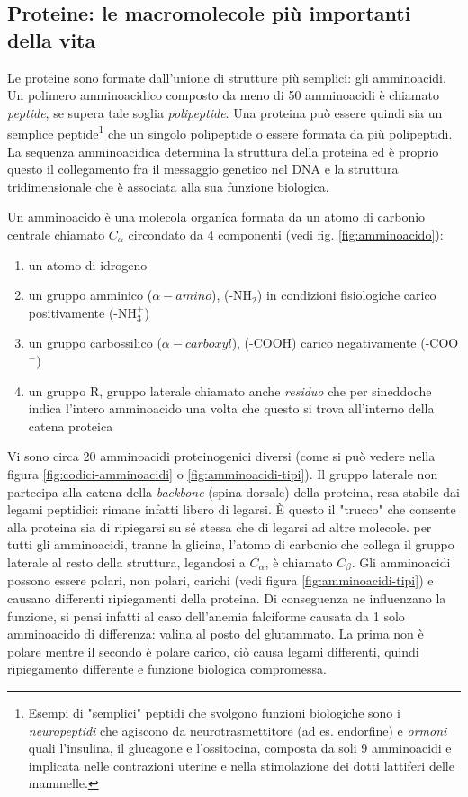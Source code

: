 \subsection{Proteine: le macromolecole più importanti della vita}

Le proteine sono formate dall'unione di strutture più semplici: gli amminoacidi. Un polimero amminoacidico composto da meno di 50 amminoacidi è chiamato \textit{peptide}, se supera tale soglia \textit{polipeptide}. Una proteina può essere quindi sia un semplice peptide\footnote{Esempi di "semplici" peptidi che svolgono funzioni biologiche sono i \textit{neuropeptidi} che agiscono da neurotrasmettitore (ad es. endorfine) e \textit{ormoni} quali l'insulina, il glucagone e l'ossitocina, composta da soli 9 amminoacidi e implicata nelle contrazioni uterine e nella stimolazione dei dotti lattiferi delle mammelle.} che un singolo polipeptide o essere formata da più polipeptidi. La sequenza amminoacidica determina la struttura della proteina ed è proprio questo il collegamento fra il messaggio genetico nel DNA e la struttura tridimensionale che è associata alla sua funzione biologica. 

\par Un amminoacido è una molecola organica formata da un atomo di carbonio centrale chiamato $C_{\alpha}$ circondato da 4 componenti (vedi fig. \ref{fig:amminoacido}):
\begin{enumerate}
	\item un atomo di idrogeno
	\item un gruppo amminico ($\alpha-amino$), (-NH$_{2}$) in condizioni fisiologiche carico positivamente (-NH$_{3}^{+}$) 
	\item un gruppo carbossilico ($\alpha-carboxyl$), (-COOH) carico negativamente (-COO$^{-}$)
	\item un gruppo R, gruppo laterale chiamato anche \textit{residuo} che per sineddoche indica l'intero amminoacido una volta che questo si trova all'interno della catena proteica
\end{enumerate}

Vi sono circa 20 amminoacidi proteinogenici diversi (come si può vedere nella figura \ref{fig:codici-amminoacidi} o \ref{fig:amminoacidi-tipi}). Il gruppo laterale non partecipa alla catena della \textit{backbone} (spina dorsale) della proteina, resa stabile dai legami peptidici: rimane infatti libero di legarsi. È questo il "trucco" che consente alla proteina sia di ripiegarsi su sé stessa che di legarsi ad altre molecole. per tutti gli amminoacidi, tranne la glicina, l'atomo di carbonio che collega il gruppo laterale al resto della struttura, legandosi a $C_{\alpha}$, è chiamato $C_{\beta}$. Gli amminoacidi possono essere polari, non polari, carichi (vedi figura \ref{fig:amminoacidi-tipi}) e causano differenti ripiegamenti della proteina. Di conseguenza ne influenzano la funzione, si pensi infatti al caso dell'anemia falciforme causata da 1 solo amminoacido di differenza: valina al posto del glutammato. La prima non è polare mentre il secondo è polare carico, ciò causa legami differenti, quindi ripiegamento differente e funzione biologica compromessa. 

